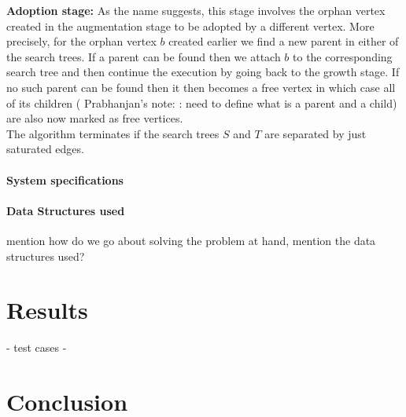 \documentclass{acm}
\newcommand{\pnote}[1]{{\color{blue} Prabhanjan's note: #1}}
\begin{document}
\noindent \textbf{Adoption stage:} As the name suggests, this stage involves the orphan vertex created in the augmentation stage to be adopted by a different vertex. More precisely, for the orphan vertex $b$ created earlier we find a new parent in either of the search trees. If a parent can be found then we attach $b$ to the corresponding search tree and then continue the execution by going back to the growth stage. If no such parent can be found then it then becomes a free vertex in which case all of its children ({\pnote: need to define what is a parent and a child}) are also now marked as free vertices. \\

\noindent The algorithm terminates if the search trees $S$ and $T$ are separated by just saturated edges. 

\paragraph{System specifications}

\paragraph{Data Structures used}

mention how do we go about solving the problem at hand, mention the data structures used? 

\section{Results}
- test cases
- 

\section{Conclusion}



\end{document}
